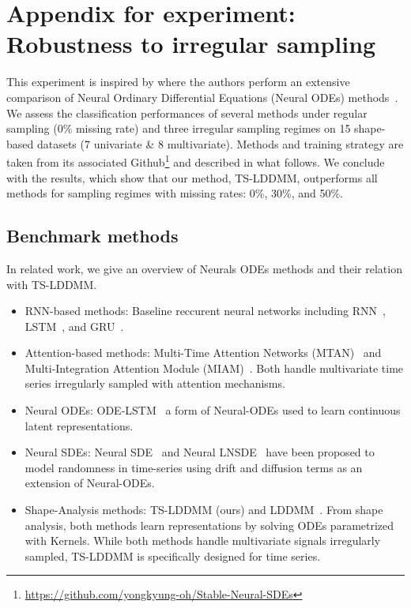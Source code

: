 \section{Appendix for experiment: Robustness to irregular sampling}
\label{appendix: robustness}

This experiment is inspired by \cite{oh2024stable} where the authors perform an extensive comparison of Neural Ordinary Differential Equations (Neural ODEs) methods~\cite{kidger2020neural}. We assess the classification
performances of several methods under regular sampling (0\% missing rate) and three irregular sampling regimes on 15 shape-based datasets (7 univariate \& 8 multivariate). Methods and training strategy are taken from its associated Github\footnote{\url{https://github.com/yongkyung-oh/Stable-Neural-SDEs}} and described in what follows. We conclude with the results, which show that our method, TS-LDDMM, outperforms all methods for sampling regimes with missing rates: 0\%, 30\%, and 50\%.

\subsection{Benchmark methods}
\label{appendix: benchmark robustness}
In related work, we give an overview of Neurals ODEs methods and their relation with TS-LDDMM.  
\begin{itemize}
  \item RNN-based methods: Baseline reccurent neural networks including RNN~\cite{medsker1999recurrent}, LSTM~\cite{hochreiter1997long}, and GRU~\cite{chung2014empirical}.

  \item Attention-based methods: Multi-Time Attention Networks (MTAN)~\cite{shukla2021multi} and Multi-Integration Attention Module (MIAM)~\cite{lee2022multi}. Both handle multivariate time series irregularly sampled with attention mechanisms.
  \item Neural ODEs: ODE-LSTM~\cite{lechner2020learning} a form of Neural-ODEs used to learn continuous latent representations. 
  \item Neural SDEs:  Neural SDE~\cite{liu2019neural} and Neural LNSDE~\cite{oh2024stable} have been proposed to model randomness in time-series using drift and diffusion terms as an extension of Neural-ODEs. 
  \item Shape-Analysis methods: TS-LDDMM (ours) and LDDMM~\cite{glaunes2008large}. From shape analysis, both methods learn representations by solving ODEs parametrized with Kernels. While both methods handle multivariate signals irregularly sampled, TS-LDDMM is specifically designed for time series.
\end{itemize}


